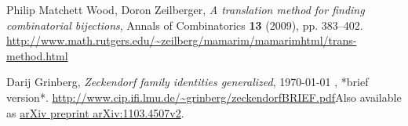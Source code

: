 \documentclass[numbers=enddot,12pt,final,onecolumn,notitlepage]{scrartcl}%
\numberwithin{exer}{section}
\theoremstyle{definition}
\begin{document}
\begin{thebibliography}{9}                                                                                                %


Philip Matchett Wood, Doron Zeilberger, \textit{A translation
method for finding combinatorial bijections}, Annals of Combinatorics
\textbf{13} (2009), pp. 383--402. \newline\url{http://www.math.rutgers.edu/~zeilberg/mamarim/mamarimhtml/trans-method.html}

Darij Grinberg, \textit{Zeckendorf family identities
generalized},
\today
, *brief version*.\newline%
\url{http://www.cip.ifi.lmu.de/~grinberg/zeckendorfBRIEF.pdf}\newline Also
available as \href{https://arxiv.org/abs/1103.4507v2}{arXiv preprint
arXiv:1103.4507v2}.
\end{thebibliography}
\end{document}
